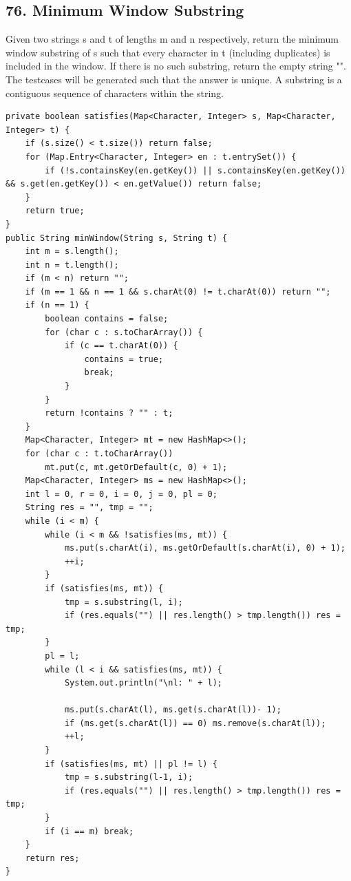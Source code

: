 \documentclass[9pt, b5paper]{article}
\begin{document}
\subsection{76. Minimum Window Substring}
\label{sec-5-4}
Given two strings s and t of lengths m and n respectively, return the minimum window substring of s such that every character in t (including duplicates) is included in the window. If there is no such substring, return the empty string "".
The testcases will be generated such that the answer is unique.
A substring is a contiguous sequence of characters within the string.
\begin{verbatim}
private boolean satisfies(Map<Character, Integer> s, Map<Character, Integer> t) {
    if (s.size() < t.size()) return false;
    for (Map.Entry<Character, Integer> en : t.entrySet()) {
        if (!s.containsKey(en.getKey()) || s.containsKey(en.getKey()) && s.get(en.getKey()) < en.getValue()) return false;
    }
    return true;
}
public String minWindow(String s, String t) {
    int m = s.length();
    int n = t.length();
    if (m < n) return "";
    if (m == 1 && n == 1 && s.charAt(0) != t.charAt(0)) return "";
    if (n == 1) {
        boolean contains = false;
        for (char c : s.toCharArray()) {
            if (c == t.charAt(0)) {
                contains = true;
                break;
            }
        }
        return !contains ? "" : t;
    } 
    Map<Character, Integer> mt = new HashMap<>();
    for (char c : t.toCharArray()) 
        mt.put(c, mt.getOrDefault(c, 0) + 1);
    Map<Character, Integer> ms = new HashMap<>();
    int l = 0, r = 0, i = 0, j = 0, pl = 0;
    String res = "", tmp = "";
    while (i < m) {
        while (i < m && !satisfies(ms, mt)) {
            ms.put(s.charAt(i), ms.getOrDefault(s.charAt(i), 0) + 1);
            ++i;
        }
        if (satisfies(ms, mt)) {
            tmp = s.substring(l, i);
            if (res.equals("") || res.length() > tmp.length()) res = tmp;
        }
        pl = l;
        while (l < i && satisfies(ms, mt)) {
            System.out.println("\nl: " + l);

            ms.put(s.charAt(l), ms.get(s.charAt(l))- 1);
            if (ms.get(s.charAt(l)) == 0) ms.remove(s.charAt(l));
            ++l;
        }
        if (satisfies(ms, mt) || pl != l) {
            tmp = s.substring(l-1, i);
            if (res.equals("") || res.length() > tmp.length()) res = tmp;
        }
        if (i == m) break;
    }
    return res;
}
\end{verbatim}
\end{document}

